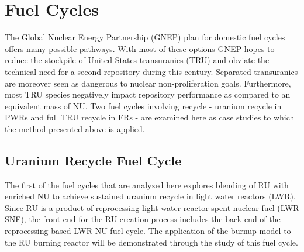 \section{Fuel Cycles}
\label{1g_sec:fc}
The Global Nuclear Energy Partnership (GNEP) plan for domestic fuel cycles offers many possible 
pathways.  With most of these options GNEP hopes to reduce the stockpile of United States 
transuranics (TRU) and obviate the technical need for a second repository during this century.  
Separated transuranics are moreover seen as dangerous to nuclear non-proliferation goals.  
Furthermore, most TRU species negatively impact repository performance as compared to an equivalent 
mass of NU.  Two fuel cycles involving recycle - uranium recycle in PWRs and full TRU recycle in 
FRs - are examined here as case studies to which the method presented above is applied. 


\subsection{Uranium Recycle Fuel Cycle}
\label{1g_sec:UFC}
The first of the fuel cycles that are analyzed here explores blending of RU with enriched NU to 
achieve sustained uranium recycle in light water reactors (LWR).  Since RU is a product of 
reprocessing light water reactor spent nuclear fuel (LWR SNF), the front end for the RU creation 
process includes the back end of the reprocessing based LWR-NU fuel cycle.  The application of the 
burnup model to the RU burning reactor will be demonstrated through the study of this fuel cycle.

